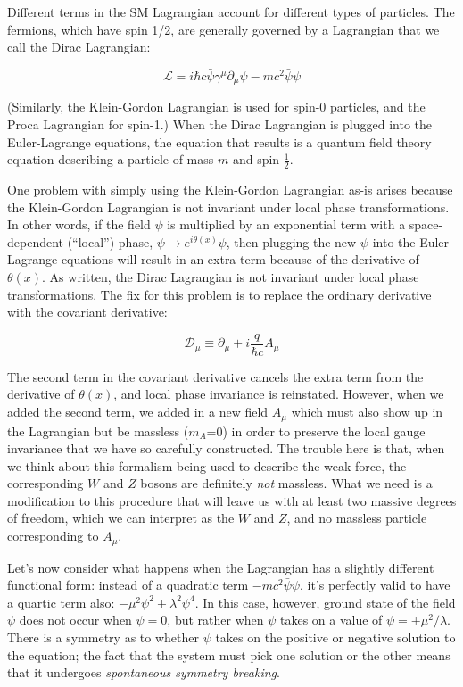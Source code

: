Different terms in the SM Lagrangian account for different types of particles.  The fermions, which have spin 1/2, are generally governed by a Lagrangian that we call the Dirac Lagrangian:

\begin{equation}
\mathscr{L}= i\hbar c \bar{\psi} \gamma^\mu \partial_\mu \psi -mc^2 \bar{\psi}\psi
\end{equation}

(Similarly, the Klein-Gordon Lagrangian is used for spin-0 particles, and the Proca Lagrangian for spin-1.)  When the Dirac Lagrangian is plugged into the Euler-Lagrange equations, the equation that results is a quantum field theory equation describing a particle of mass $m$ and spin $\frac{1}{2}$.  

One problem with simply using the Klein-Gordon Lagrangian as-is arises because the Klein-Gordon Lagrangian is not invariant under local phase transformations.  In other words, if the field $\psi$ is multiplied by an exponential term with a space-dependent (``local'') phase, $\psi \rightarrow e^{i\theta(x)} \psi$, then plugging the new $\psi$ into the Euler-Lagrange equations will result in an extra term because of the derivative of $\theta(x)$.  As written, the Dirac Lagrangian is not invariant under local phase transformations.  The fix for this problem is to replace the ordinary derivative with the covariant derivative:

\begin{equation}
\mathscr{D}_\mu \equiv \partial_\mu + i\frac{q}{\hbar c}A_\mu
\end{equation}

The second term in the covariant derivative cancels the extra term from the derivative of $\theta(x)$, and local phase invariance is reinstated.  However, when we added the second term, we added in a new field $A_\mu$ which must also show up in the Lagrangian but be massless ($m_A$=0) in order to preserve the local gauge invariance that we have so carefully constructed.  The trouble here is that, when we think about this formalism being used to describe the weak force, the corresponding $W$ and $Z$ bosons are definitely \textit{not} massless.  What we need is a modification to this procedure that will leave us with at least two massive degrees of freedom, which we can interpret as the $W$ and $Z$, and no massless particle corresponding to $A_\mu$.

Let's now consider what happens when the Lagrangian has a slightly different functional form: instead of a quadratic term $-mc^2\bar{\psi}\psi$, it's perfectly valid to have a quartic term also: $-\mu^2\psi^2+\lambda^2 \psi^4$.  In this case, however, ground state of the field $\psi$ does not occur when $\psi=0$, but rather when $\psi$ takes on a value of $\psi = \pm \mu^2/\lambda$.  There is a symmetry as to whether $\psi$ takes on the positive or negative solution to the equation; the fact that the system must pick one solution or the other means that it undergoes \textit{spontaneous symmetry breaking}.

